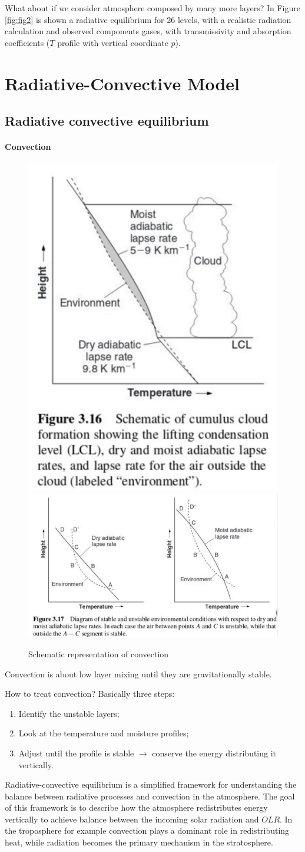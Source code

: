 What about if we consider atmosphere composed by many more layers?
In Figure \ref{fig:fig2} is shown a radiative equilibrium for 26 levels, with a realistic radiation calculation and observed components gases, with transmissivity and absorption coefficients ($T$ profile with vertical coordinate $p$).

\section{Radiative-Convective Model}
\subsection{Radiative convective equilibrium}\label{subsec:convection adjustments}
\paragraph{Convection}
\begin{figure}[htpb]
	\centering
	\includegraphics[width=0.28\linewidth]{uploads/Screenshot 2024-11-20 130640.png}\quad \includegraphics[width=0.5\linewidth]{uploads/Screenshot 2024-11-20 130727.png}
	\caption{Schematic representation of convection}

\end{figure}
Convection is about low layer mixing until they are gravitationally stable.

How to treat convection? Basically three steps:
\begin{enumerate}
	\item Identify the unstable layers;
	\item Look at the temperature and moisture profiles;
	\item Adjust until the profile is stable $\rightarrow$ conserve the energy distributing it vertically.
\end{enumerate}
Radiative-convective equilibrium is a simplified framework for understanding the balance between radiative processes and convection in the atmosphere. The goal of this framework is to describe how the atmosphere redistributes energy vertically to achieve balance between the incoming solar radiation and $OLR$. In the troposphere for example convection plays a dominant role in redistributing heat, while radiation becomes the primary mechanism in the stratosphere.


